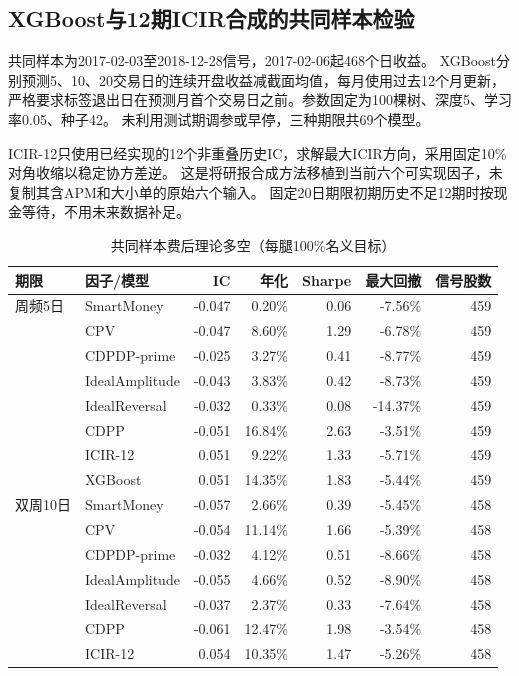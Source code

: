 \documentclass[UTF8,zihao=-4,fontset=fandol]{ctexart}
\renewcommand{\arraystretch}{1.25}
\begin{document}
\clearpage
\subsection{XGBoost与12期ICIR合成的共同样本检验}
共同样本为2017-02-03至2018-12-28信号，2017-02-06起468个日收益。
XGBoost分别预测5、10、20交易日的连续开盘收益减截面均值，每月使用过去12个月更新，
严格要求标签退出日在预测月首个交易日之前。参数固定为100棵树、深度5、学习率0.05、种子42。
未利用测试期调参或早停，三种期限共69个模型。

ICIR-12只使用已经实现的12个非重叠历史IC，求解最大ICIR方向，采用固定10\%对角收缩以稳定协方差逆。
这是将研报合成方法移植到当前六个可实现因子，未复制其含APM和大小单的原始六个输入。
固定20日期限初期历史不足12期时按现金等待，不用未来数据补足。

\begin{table}[H]\centering\footnotesize
\caption{共同样本费后理论多空（每腿100\%名义目标）}
\setlength{\tabcolsep}{4pt}\renewcommand{\arraystretch}{1.05}
\begin{tabular}{llrrrrr}\toprule
期限 & 因子/模型 & IC & 年化 & Sharpe & 最大回撤 & 信号股数\\\midrule
周频5日 & SmartMoney & -0.047 & 0.20\% & 0.06 & -7.56\% & 459 \\
 & CPV & -0.047 & 8.60\% & 1.29 & -6.78\% & 459 \\
 & CDPDP-prime & -0.025 & 3.27\% & 0.41 & -8.77\% & 459 \\
 & IdealAmplitude & -0.043 & 3.83\% & 0.42 & -8.73\% & 459 \\
 & IdealReversal & -0.032 & 0.33\% & 0.08 & -14.37\% & 459 \\
 & CDPP & -0.051 & 16.84\% & 2.63 & -3.51\% & 459 \\
 & ICIR-12 & 0.051 & 9.22\% & 1.33 & -5.71\% & 459 \\
\rowcolor{blue!7}
 & XGBoost & 0.051 & 14.35\% & 1.83 & -5.44\% & 459 \\
\midrule
双周10日 & SmartMoney & -0.057 & 2.66\% & 0.39 & -5.45\% & 458 \\
 & CPV & -0.054 & 11.14\% & 1.66 & -5.39\% & 458 \\
 & CDPDP-prime & -0.032 & 4.12\% & 0.51 & -8.66\% & 458 \\
 & IdealAmplitude & -0.055 & 4.66\% & 0.52 & -8.90\% & 458 \\
 & IdealReversal & -0.037 & 2.37\% & 0.33 & -7.64\% & 458 \\
 & CDPP & -0.061 & 12.47\% & 1.98 & -3.54\% & 458 \\
 & ICIR-12 & 0.054 & 10.35\% & 1.47 & -5.26\% & 458 \\

\end{tabular}
\end{table}
\end{document}
